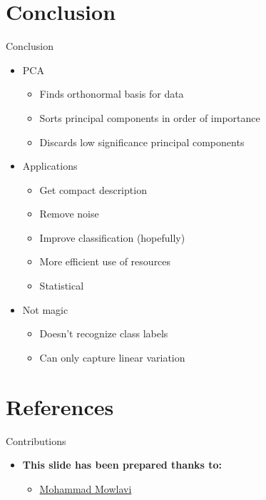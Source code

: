 \documentclass[serif, aspectratio=169]{beamer}
\begin{document}
\section{Conclusion}

\begin{frame}{Conclusion}
    \begin{itemize}
        \item PCA 
        \begin{itemize}
            \item Finds orthonormal basis for data
            \item Sorts principal components in order of importance
            \item Discards low significance principal components
        \end{itemize}
        \item Applications
        \begin{itemize}
            \item Get compact description
            \item Remove noise
            \item Improve classification (hopefully)
            \item More efficient use of resources
            \item Statistical
        \end{itemize}
        \item Not magic
        \begin{itemize}
            \item  Doesn’t recognize class labels
            \item Can only capture linear variation
        \end{itemize}
    \end{itemize}
\end{frame}

\section{References}

\begin{frame}{Contributions}
    \begin{itemize}
        \itemsep1em
        \item \textbf{This slide has been prepared thanks to:}
        \begin{itemize}
            \itemsep1em
            \item \href{https://github.com/MohammadMow/}{Mohammad Mowlavi}
        \end{itemize}
    \end{itemize}
\end{frame}

\begin{frame}[allowframebreaks]
    
    
    \nocite{*}
\end{frame}
\end{document}

